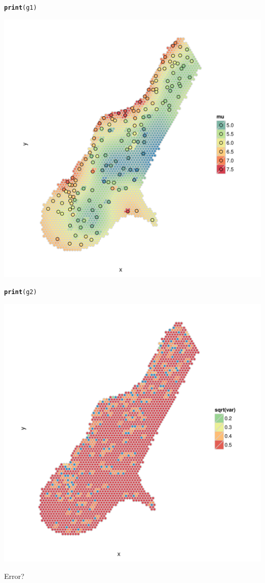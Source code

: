 \documentclass{article}\usepackage[]{graphicx}\usepackage[]{color}
\makeatletter
\def\maxwidth{ %
  \ifdim\Gin@nat@width>\linewidth
    \linewidth
  \else
    \Gin@nat@width
  \fi
}
\newcommand{\hlstd}[1]{\textcolor[rgb]{0.345,0.345,0.345}{#1}}%
\newcommand{\hlkwd}[1]{\textcolor[rgb]{0.737,0.353,0.396}{\textbf{#1}}}%
\newenvironment{kframe}{%
 \def\at@end@of@kframe{}%
 \ifinner\ifhmode%
  \def\at@end@of@kframe{\end{minipage}}%
  \begin{minipage}{\columnwidth}%
 \fi\fi%
 \def\FrameCommand##1{\hskip\@totalleftmargin \hskip-\fboxsep
 \colorbox{shadecolor}{##1}\hskip-\fboxsep
     \hskip-\linewidth \hskip-\@totalleftmargin \hskip\columnwidth}%
 \MakeFramed {\advance\hsize-\width
   \@totalleftmargin\z@ \linewidth\hsize
   \@setminipage}}%
 {\par\unskip\endMakeFramed%
 \at@end@of@kframe}
\newenvironment{knitrout}{}{} %
\makeatother
\begin{document}
\begin{knitrout}
\begin{kframe}
\begin{alltt}
\hlkwd{print}\hlstd{(g1)}
\end{alltt}
\end{kframe}
\includegraphics[width=\maxwidth]{figure/unnamed-chunk-1-2} 
\begin{kframe}\begin{alltt}
\hlkwd{print}\hlstd{(g2)}
\end{alltt}
\end{kframe}
\includegraphics[width=\maxwidth]{figure/unnamed-chunk-1-3} 

\end{knitrout}

Error?
\end{document}
